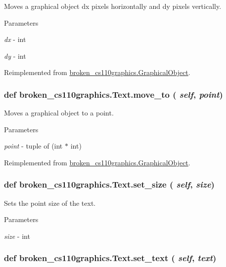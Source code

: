 Moves a graphical object dx pixels horizontally and dy pixels vertically. 
\begin{DoxyParams}{Parameters}
\item[{\em dx}]-\/ int \item[{\em dy}]-\/ int \end{DoxyParams}


Reimplemented from \hyperlink{classbroken__cs110graphics_1_1GraphicalObject_aebbdd098df38319fa08db41caad93282}{broken\_\-cs110graphics.GraphicalObject}.\hypertarget{classbroken__cs110graphics_1_1Text_a7125cca1813d3cf1f3177b736c5f7b92}{
\subsubsection[{move\_\-to}]{\setlength{\rightskip}{0pt plus 5cm}def broken\_\-cs110graphics.Text.move\_\-to ( {\em self}, \/   {\em point})}}
\label{classbroken__cs110graphics_1_1Text_a7125cca1813d3cf1f3177b736c5f7b92}


Moves a graphical object to a point. 
\begin{DoxyParams}{Parameters}
\item[{\em point}]-\/ tuple of (int $\ast$ int) \end{DoxyParams}


Reimplemented from \hyperlink{classbroken__cs110graphics_1_1GraphicalObject_ad41f02c6b8a874f21ca63bcb6a0320c5}{broken\_\-cs110graphics.GraphicalObject}.\hypertarget{classbroken__cs110graphics_1_1Text_a113b9948f22c3826e73b73901e911d47}{
\subsubsection[{set\_\-size}]{\setlength{\rightskip}{0pt plus 5cm}def broken\_\-cs110graphics.Text.set\_\-size ( {\em self}, \/   {\em size})}}
\label{classbroken__cs110graphics_1_1Text_a113b9948f22c3826e73b73901e911d47}


Sets the point size of the text. 
\begin{DoxyParams}{Parameters}
\item[{\em size}]-\/ int \end{DoxyParams}
\hypertarget{classbroken__cs110graphics_1_1Text_ae365322ac7b06470cfc4cdc42db859ed}{
\subsubsection[{set\_\-text}]{\setlength{\rightskip}{0pt plus 5cm}def broken\_\-cs110graphics.Text.set\_\-text ( {\em self}, \/   {\em text})}}
\label{classbroken__cs110graphics_1_1Text_ae365322ac7b06470cfc4cdc42db859ed}


